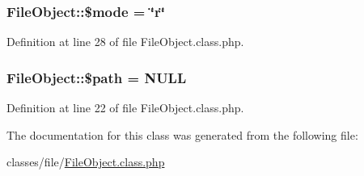 \hypertarget{classFileObject_aa4cff8a1b117de6986c0765ae2284dab}{
\subsubsection[{\$mode}]{\setlength{\rightskip}{0pt plus 5cm}File\+Object\+::\$mode = \char`\"{}r\char`\"{}}}\label{classFileObject_aa4cff8a1b117de6986c0765ae2284dab}


Definition at line 28 of file File\+Object.\+class.\+php.

\hypertarget{classFileObject_aeaea5fd423f0c1349ad151f7da63f0e8}{
\subsubsection[{\$path}]{\setlength{\rightskip}{0pt plus 5cm}File\+Object\+::\$path = N\+U\+L\+L}}\label{classFileObject_aeaea5fd423f0c1349ad151f7da63f0e8}


Definition at line 22 of file File\+Object.\+class.\+php.



The documentation for this class was generated from the following file\+:\begin{DoxyCompactItemize}
\item 
classes/file/\hyperlink{FileObject_8class_8php}{File\+Object.\+class.\+php}\end{DoxyCompactItemize}
